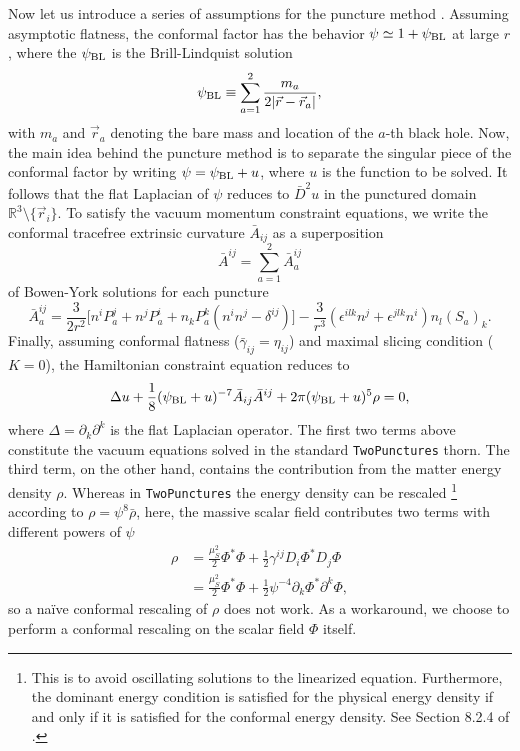 Now let us introduce a series of assumptions for the puncture method
\cite{scalar_TwoPunctures_BBHSF_Brandt:1997tf}.
Assuming asymptotic flatness, the conformal factor has the behavior
$\psi \simeq 1 + \psi_{\rm BL}$ at large $r$,
where the $\psi_{\rm BL}$ is the Brill-Lindquist solution
\begin{equation}
    \psi_{\rm BL} \equiv \sum_{a=1}^2 \frac{m_a}{2|\vec{r} - \vec{r}_a|},
\end{equation}
with $m_a$ and $\vec{r}_a$ denoting the bare mass and location of the $a$-th black hole.
Now, the main idea behind the puncture method is to separate the singular piece of the conformal factor by writing
$ \psi = \psi_{\rm BL} + u $,
where $u$ is the function to be solved.
It follows that the flat Laplacian of $\psi$ reduces to $\bar{D}^2 u$ in the punctured domain
$\mathbb{R}^3\setminus\{\vec{r}_i\}$.
To satisfy the vacuum momentum constraint equations, we write the conformal tracefree extrinsic curvature $\bar{A}_{ij}$ as a superposition
\begin{equation}
    \bar{A}^{ij} = \sum_{a=1}^2 \bar{A}_a^{ij}
\end{equation}
of Bowen-York solutions for each puncture
\begin{equation}
    \bar{A}_a^{ij} = \frac{3}{2r^2} \Big[
        n^i P_a^j + n^j P_a^i + n_k P_a^k (n^i n^j - \delta^{ij}) \Big]
        - \frac{3}{r^3} (\epsilon^{ilk} n^j + \epsilon^{jlk} n^i) n_l {(S_a)}_k.
\end{equation}
Finally, assuming conformal flatness ($\bar{\gamma}_{ij} = \eta_{ij}$) and maximal slicing condition ($K=0$), the Hamiltonian constraint equation reduces to
\begin{equation}
    \Delta u + \frac{1}{8} (\psi_{\rm BL} + u)^{-7} \bar{A}_{ij} \bar{A}^{ij}
    + 2\pi (\psi_{\rm BL} + u)^5 \rho = 0,
    \label{scalar_TwoPunctures_BBHSF_eq:ham_twopunctures}
\end{equation}
where $\Delta=\partial_k \partial^k$ is the flat Laplacian operator.
The first two terms above constitute the vacuum equations solved in the standard \texttt{TwoPunctures} thorn.
The third term, on the other hand, contains the contribution from the matter energy density $\rho$.
Whereas in \texttt{TwoPunctures} the energy density can be rescaled
\footnote{
This is to avoid oscillating solutions to the linearized equation.
Furthermore, the dominant energy condition is satisfied for the 
physical energy density if and only if it is satisfied for the conformal energy density.
See Section 8.2.4 of \cite{scalar_TwoPunctures_BBHSF_Gourgoulhon:2007ue}.
} according to $\rho = \psi^8 \bar{\rho}$,
here, the massive scalar field contributes two terms with different powers of $\psi$
\begin{align}
    \rho
    &= \frac{\mu_S^2}{2} \Phi^* \Phi
    + \frac{1}{2} \gamma^{ij} D_i\Phi^* D_j \Phi
    \nonumber
    \\
    &= \frac{\mu_S^2}{2} \Phi^* \Phi
    + \frac{1}{2} \psi^{-4} \partial_k\Phi^* \partial^k \Phi,
    \label{scalar_TwoPunctures_BBHSF_eq:rho}
\end{align}
so a na\"{i}ve conformal rescaling of $\rho$ does not work.
As a workaround, we choose to perform a conformal rescaling on the scalar field $\Phi$ itself.

